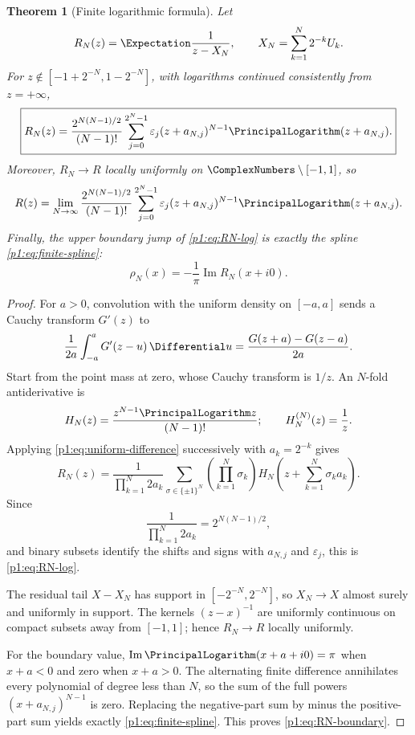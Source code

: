 \documentclass[11pt]{article}
\newtheorem{theorem}{Theorem}[section]
\theoremstyle{definition}
\theoremstyle{remark}
\newcommand{\eps}{\varepsilon}
\begin{document}
\begin{theorem}[Finite logarithmic formula]\label{p1:thm:finite-log}
Let
\[
 R_N(z)=\Expectation\frac1{z-X_N},
 \qquad X_N=\sum_{k=1}^{N}2^{-k}U_k.
\]
For \(z\notin[-1+2^{-N},1-2^{-N}]\), with logarithms continued consistently from
\(z=+\infty\),
\begin{equation}
 \boxed{
 R_N(z)=\frac{2^{N(N-1)/2}}{(N-1)!}
 \sum_{j=0}^{2^N-1}\eps_j
 (z+a_{N,j})^{N-1}\PrincipalLogarithm(z+a_{N,j}).
 }                                                           \label{p1:eq:RN-log}
\end{equation}
Moreover, \(R_N\to R\) locally uniformly on \(\ComplexNumbers\setminus[-1,1]\), so
\begin{equation}
 R(z)=\lim_{N\to\infty}\frac{2^{N(N-1)/2}}{(N-1)!}
 \sum_{j=0}^{2^N-1}\eps_j
 (z+a_{N,j})^{N-1}\PrincipalLogarithm(z+a_{N,j}).                           \label{p1:eq:R-log-limit}
\end{equation}
Finally, the upper boundary jump of \eqref{p1:eq:RN-log} is exactly the spline
\eqref{p1:eq:finite-spline}:
\begin{equation}
 \rho_N(x)=-\frac1\pi\operatorname{Im}R_N(x+i0).
                                                                    \label{p1:eq:RN-boundary}
\end{equation}
\end{theorem}

\begin{proof}
For \(a>0\), convolution with the uniform density on \([-a,a]\) sends a Cauchy transform
\(G'(z)\) to
\begin{equation}
 \frac1{2a}\int_{-a}^{a}G'(z-u)\,\Differential u
 =\frac{G(z+a)-G(z-a)}{2a}.                                  \label{p1:eq:uniform-difference}
\end{equation}
Start from the point mass at zero, whose Cauchy transform is \(1/z\).  An \(N\)-fold
antiderivative is
\[
 H_N(z)=\frac{z^{N-1}\PrincipalLogarithm z}{(N-1)!};
 \qquad H_N^{(N)}(z)=\frac1z.
\]
Applying \eqref{p1:eq:uniform-difference} successively with \(a_k=2^{-k}\) gives
\[
 R_N(z)=\frac{1}{\prod_{k=1}^{N}2a_k}
 \sum_{\sigma\in\{\pm1\}^N}
 \left(\prod_{k=1}^{N}\sigma_k\right)
 H_N\!\left(z+\sum_{k=1}^{N}\sigma_k a_k\right).
\]
Since
\[
 \frac1{\prod_{k=1}^{N}2a_k}=2^{N(N-1)/2},
\]
and binary subsets identify the shifts and signs with \(a_{N,j}\) and \(\eps_j\), this is
\eqref{p1:eq:RN-log}.

The residual tail \(X-X_N\) has support in \([-2^{-N},2^{-N}]\), so \(X_N\to X\)
almost surely and uniformly in support.  The kernels \((z-x)^{-1}\) are uniformly
continuous on compact subsets away from \([-1,1]\); hence \(R_N\to R\) locally uniformly.

For the boundary value, \(\operatorname{Im}\PrincipalLogarithm(x+a+i0)=\pi\) when \(x+a<0\) and zero
when \(x+a>0\).  The alternating finite difference annihilates every polynomial of degree
less than \(N\), so the sum of the full powers \((x+a_{N,j})^{N-1}\) is zero.  Replacing the
negative-part sum by minus the positive-part sum yields exactly
\eqref{p1:eq:finite-spline}.  This proves \eqref{p1:eq:RN-boundary}.
\end{proof}
\end{document}
